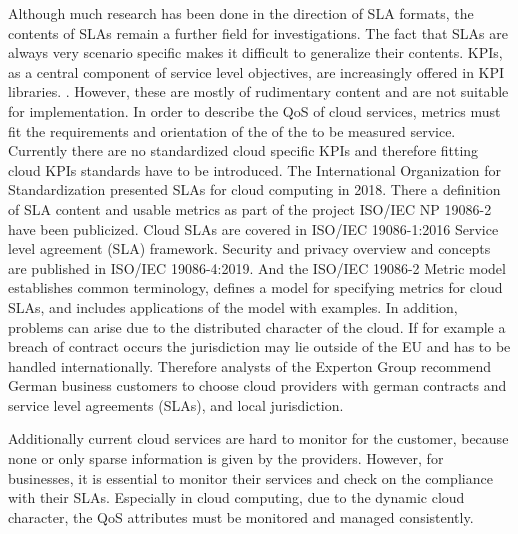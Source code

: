 Although much research has been done in the direction of SLA formats, the contents of SLAs remain a further field for investigations. The fact that SLAs are always very scenario specific makes it difficult to generalize their contents. KPIs, as a central component of service level objectives, are increasingly offered in KPI libraries. \cite{KPI}. However, these are mostly of rudimentary content and are not suitable for implementation. In order to describe the QoS of cloud services, metrics must fit the requirements and orientation of the of the to be measured service. Currently there are no standardized cloud specific KPIs and therefore fitting cloud KPIs standards have to be introduced. The International Organization for Standardization presented SLAs for cloud computing in 2018. There a definition of SLA content and usable metrics as part of the project ISO/IEC NP 19086-2  \cite{ISOnew} have been publicized. Cloud SLAs are covered in ISO/IEC 19086-1:2016 Service level agreement (SLA) framework. Security and privacy overview and concepts are published in ISO/IEC 19086-4:2019. And the ISO/IEC 19086-2 Metric model establishes common terminology, defines a model for specifying metrics for cloud SLAs, and includes applications of the model with examples.  In addition, problems can arise due to the distributed character of the cloud. If for example a breach of contract occurs the jurisdiction may lie outside of the EU and has to be handled internationally. Therefore analysts of the Experton Group  \cite{Experton} recommend German business customers to choose cloud providers with german contracts and service level agreements (SLAs), and local jurisdiction. 

Additionally current cloud services are hard to monitor for the customer, because none or only sparse information is given by the providers. However, for businesses, it is essential to monitor their services and check on the compliance with their SLAs. Especially in cloud computing, due to the dynamic cloud character, the QoS attributes must be monitored and managed consistently. \cite{wsla}



